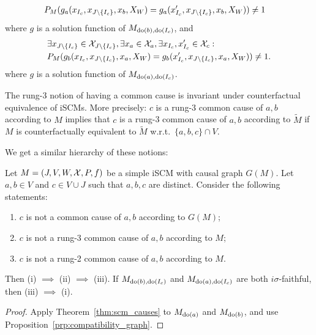 \begin{Rem}
\begin{equation*}
\begin{split}
      & P_M(g_a(x_{I_c},x_{J\setminus\{I_c\}},x_b,X_W) = g_a(x_{I_c}',x_{J\setminus\{I_c\}},x_b,X_W)) \ne 1
    \end{split}\end{equation*}
  where $g$ is a solution function of $M_{\operatorname{do}(b),\operatorname{do}(I_c)}$, and
    \begin{equation*}\begin{split}
      & \exists x_{J\setminus\{I_c\}} \in \mathcal{X}_{J\setminus\{I_c\}}, \exists x_a \in \mathcal{X}_a, \exists x_{I_c},x_{I_{c}}' \in \mathcal{X}_c: \\
      & P_M(g_b(x_{I_c},x_{J\setminus\{I_c\}},x_a,X_W) = g_b(x_{I_c}',x_{J\setminus\{I_c\}},x_a,X_W)) \ne 1.
    \end{split}\end{equation*}
  where $g$ is a solution function of $M_{\operatorname{do}(a),\operatorname{do}(I_c)}$.
\end{Rem}
\begin{Rem}\label{rem:scm_rung3_common_cause_of_counterfactual_equivalence}
  The rung-3 notion of having a common cause is invariant under counterfactual equivalence of iSCMs.
  More precisely: $c$ is a rung-3 common cause of $a,b$ according to $M$ implies that $c$ is a rung-3 common cause of $a,b$ according to $\tilde{M}$ if $M$ is counterfactually equivalent to $\tilde{M}$ w.r.t.\ $\{a,b,c\} \cap V$.
\end{Rem}
We get a similar hierarchy of these notions:
\begin{Cor}\label{cor:scm_common_cause_of}
  Let $M = \left ( J, V, W, \mathcal{X}, P, f \right )$ be a simple iSCM with causal graph $G(M)$.
  Let $a, b \in V$ and $c \in V \cup J$ such that $a,b,c$ are distinct.
  Consider the following statements:
  \begin{enumerate}
    \item[(i)]   $c$ is not a common cause of $a,b$ according to $G(M)$;
    \item[(ii)]  $c$ is not a rung-3 common cause of $a,b$ according to $M$;
    \item[(iii)] $c$ is not a rung-2 common cause of $a,b$ according to $M$.
  \end{enumerate}
  Then (i) $\implies$ (ii) $\implies$ (iii). 
  If $M_{\operatorname{do}(b),\operatorname{do}(I_c)}$ and $M_{\operatorname{do}(a),\operatorname{do}(I_c)}$ are both $i\sigma$-faithful, then (iii) $\implies$ (i).
\end{Cor}
\begin{proof}
  Apply Theorem~\ref{thm:scm_causes} to $M_{\operatorname{do}(a)}$ and $M_{\operatorname{do}(b)}$, and use Proposition~\ref{prp:compatibility_graph}.
\end{proof}

